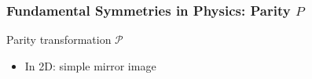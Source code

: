 \begin{frame}[t]
 \frametitle{Fundamental Symmetries in Physics: Parity $P$}
 \begin{block}{Parity transformation $\mathcal{P}$}
  \begin{itemize}
   \item In 2D: simple \alert{mirror image}
  \end{itemize}
  \begin{center}
  \end{center}
 \end{block}
\end{frame}
